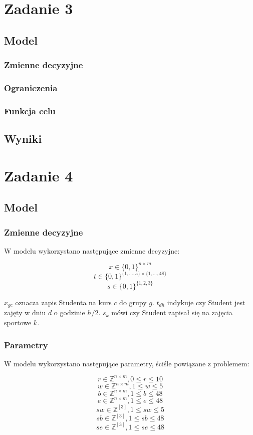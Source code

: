 \documentclass{article}
\theoremstyle{definition}
\theoremstyle{remark}
\theoremstyle{plain}
\theoremstyle{remark}
\theoremstyle{plain}
\begin{document}
\section{Zadanie 3}
\subsection{Model}
\subsubsection{Zmienne decyzyjne}
\subsubsection{Ograniczenia}
\subsubsection{Funkcja celu}

\subsection{Wyniki}

    
\section{Zadanie 4}
\subsection{Model}
\subsubsection{Zmienne decyzyjne}
W modelu wykorzystano następujące zmienne decyzyjne:

\[ x \in \{0,1\}^{n\times m} \]
\[ t \in \{0,1\}^{\{1,\ldots,5\}\times \{1,\ldots,48\}} \]
\[ s \in \{0,1\}^{\{1,2,3\}} \]

$x_{gc}$ oznacza zapis Studenta na kurs $c$ do grupy $g$. 
$t_{dh}$ indykuje czy Student jest zajęty w dniu $d$ o godzinie $h/2$.
$s_k$ mówi czy Student zapisał się na zajęcia sportowe $k$.

\subsubsection{Parametry}
W modelu wykorzystano następujące parametry, ściśle powiązane z problemem:

\[ r \in \mathbb{Z}^{n\times m}, 0 \leq r \leq 10 \]
\[ w \in \mathbb{Z}^{n\times m}, 1 \leq w \leq 5 \]
\[ b \in \mathbb{Z}^{n\times m}, 1 \leq b \leq 48 \]
\[ e \in \mathbb{Z}^{n\times m}, 1 \leq e \leq 48 \]
\[ sw \in \mathbb{Z}^{[3]}, 1 \leq sw \leq 5 \]
\[ sb \in \mathbb{Z}^{[3]}, 1 \leq sb \leq 48 \]
\[ se \in \mathbb{Z}^{[3]}, 1 \leq se \leq 48 \]
\end{document}
